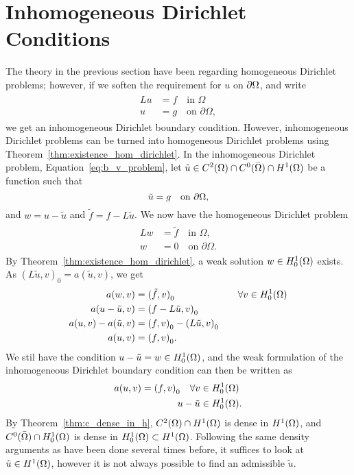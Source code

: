 \section{Inhomogeneous Dirichlet Conditions}
The theory in the previous section have been regarding homogeneous 
Dirichlet problems; however, if we soften the requirement for $u$ on $\partial\Omega$,
and write 
\begin{align}
\begin{split}
    Lu &= f \quad \text{in } \Omega \label{eq:b_v_problem} \\
    u &= g \quad \text{on } \partial \Omega,
\end{split}
\end{align}
we get an inhomogeneous Dirichlet boundary condition.
However, inhomogeneous
Dirichlet problems can be turned into homogeneous Dirichlet problems 
using Theorem~\ref{thm:existence_hom_dirichlet}. 
In the inhomogeneous Dirichlet problem, Equation~\eqref{eq:b_v_problem}, let 
$\tilde{u} \in C^2(\Omega)\cap C^0(\bar{\Omega}) \cap H^1(\Omega)$ be a function such that 
\begin{equation*}
   \tilde{u} = g \quad \text{on } \partial \Omega,
\end{equation*}
and $w = u-\tilde{u}$ and $\tilde{f} = f-L\tilde{u}$. We now have the homogeneous 
Dirichlet problem 
\begin{align}
\begin{split}
    Lw &= \tilde{f} \quad \text{in } \Omega,  \\
    w &= 0 \quad \text{on } \partial \Omega. 
\end{split}
\end{align}
By Theorem~\ref{thm:existence_hom_dirichlet},
 a weak solution $w \in H_0^1(\Omega)$ exists. As ${(L\tilde{u},v)}_0 = a(\tilde{u},v)$,
we get
\begin{alignat*}{2}
      a(w,v) &= {(\tilde{f},v)}_0 \quad &&\forall v \in H_0^1(\Omega) \\
      a(u-\tilde{u},v) &= {(f-L\tilde{u},v)}_0 &&\\
      a(u,v) - a(\tilde{u},v) &= {(f,v)}_0 - {(L\tilde{u},v)}_0 \quad && \\
      a(u,v) &= {(f,v)}_0. &&
\end{alignat*}
We stil have the condition $u-\tilde{u}=w\in H_0^1(\Omega)$, and the weak formulation 
of the inhomogeneous Dirichlet boundary condition can then be written as
\begin{align*}
   a(u,v) = {(f,v)}_0 \quad \forall v &\in H_0^1(\Omega) \\
   u-\tilde{u} & \in H_0^1(\Omega).
\end{align*}
By Theorem~\ref{thm:c_dense_in_h}, $C^2(\Omega)\cap H^1(\Omega)$ is dense in $H^1(\Omega)$, 
and $C^0(\bar{\Omega})\cap H^1_0(\Omega)$ 
is dense in $H^1_0(\Omega) \subset H^1(\Omega)$. Following the same density arguments 
as have been done several times before, it suffices to look at $\tilde{u}\in H^1(\Omega)$, however it is not always possible to find an admissible $\tilde{u}$.

